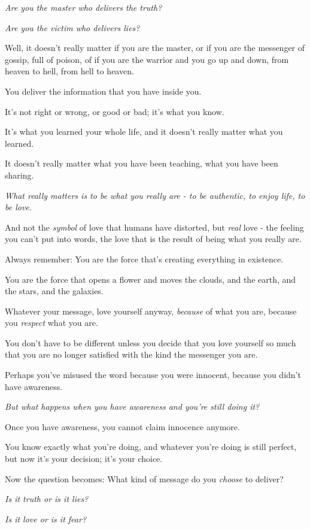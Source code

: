 \documentclass{article}
\numberwithin{equation}{section}
\begin{document}
\textit{Are you the master who delivers the truth?}

\textit{Are you the victim who delivers lies?}

Well, it doesn't really matter if you are the master, or if you are the messenger of gossip, full of poison, of if you are the warrior and you go up and down, from heaven to hell, from hell to heaven.

You deliver the information that you have inside you.

It's not right or wrong, or good or bad; it's what you know.

It's what you learned your whole life, and it doesn't really matter what you learned.

It doesn't really matter what you have been teaching, what you have been sharing.

%
\textit{What really matters is to be what you really are - to be authentic, to enjoy life, to be love}.

And not the \textit{symbol} of love that humans have distorted, but \textit{real} love - the feeling you can't put into words, the love that is the result of being what you really are.

Always remember: You are the force that's creating everything in existence.

You are the force that opens a flower and moves the clouds, and the earth, and the stars, and the galaxies.

Whatever your message, love yourself anyway, \textit{because} of what you are, because you \textit{respect} what you are.

You don't have to be different unless you decide that you love yourself so much that you are no longer satisfied with the kind the messenger you are.

%
Perhaps you've misused the word because you were innocent, because you didn't have awareness.

\textit{But what happens when you have awareness and you're still doing it?}

Once you have awareness, you cannot claim innocence anymore.

You know exactly what you're doing, and whatever you're doing is still perfect, but now it's your decision; it's your choice.

Now the question becomes: What kind of message do you \textit{choose} to deliver?

\textit{Is it truth or is it lies?}

\textit{Is it love or is it fear?}
\end{document}
